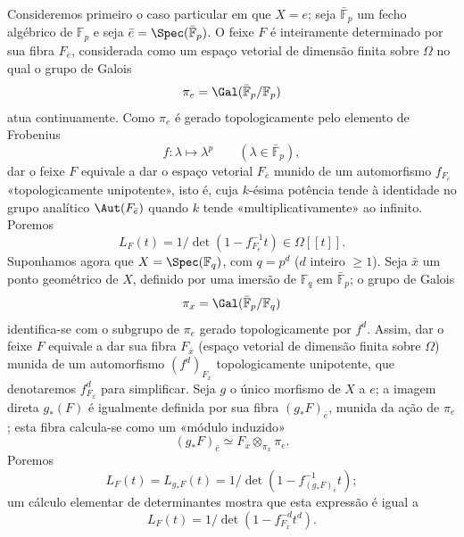 Consideremos primeiro o caso particular em que $X=e$; seja $\bar{\mathbb F}_p$ um fecho algébrico de $\mathbb F_p$ e seja $\bar e=\Spec(\bar{\mathbb F}_p)$. O feixe $F$ é inteiramente determinado por sua fibra $F_{\bar e}$, considerada como um espaço vetorial de dimensão finita sobre $\Omega$ no qual o grupo de Galois
\[
\pi_e=\Gal(\bar{\mathbb F}_p/\mathbb F_p)
\]
atua continuamente. Como $\pi_e$ é gerado topologicamente pelo elemento de Frobenius
\[
f: \lambda\longmapsto \lambda^p\qquad(\lambda\in\bar{\mathbb F}_p),
\]
dar o feixe $F$ equivale a dar o espaço vetorial $F_{\bar e}$ munido de um automorfismo $f_{F_{\bar e}}$ «topologicamente unipotente», isto é, cuja $k$-ésima potência tende à identidade no grupo analítico $\Aut(F_{\bar e})$ quando $k$ tende «multiplicativamente» ao infinito. Poremos
\[
L_F(t)=1/\det(1-f_{F_{\bar e}}^{-1}t)\in\Omega[[t]].
\]
Suponhamos agora que $X=\Spec(\mathbb F_q)$, com $q=p^d$ ($d$ inteiro $\ge1$). Seja $\bar x$ um ponto geométrico de $X$, definido por uma imersão de $\mathbb F_q$ em $\bar{\mathbb F}_p$; o grupo de Galois
\[
\pi_x=\Gal(\bar{\mathbb F}_p/\mathbb F_q)
\]
identifica-se com o subgrupo de $\pi_e$ gerado topologicamente por $f^d$. Assim, dar o feixe $F$ equivale a dar sua fibra $F_{\bar x}$ (espaço vetorial de dimensão finita sobre $\Omega$) munida de um automorfismo $(f^d)_{F_{\bar x}}$ topologicamente unipotente, que denotaremos $f^d_{F_{\bar x}}$ para simplificar. Seja $g$ o único morfismo de $X$ a $e$; a imagem direta $g_*(F)$ é igualmente definida por sua fibra $(g_*F)_{\bar e}$, munida da ação de $\pi_e$; esta fibra calcula-se como um «módulo induzido»
\[
(g_*F)_{\bar e}\simeq F_{\bar x}\otimes_{\pi_x}\pi_e.
\]
Poremos
\[
L_F(t)=L_{g_*F}(t)=1/\det(1-f^{-1}_{(g_*F)_{\bar e}}t);
\]
um cálculo elementar de determinantes mostra que esta expressão é igual a
\[
L_F(t)=1/\det(1-f^{-d}_{F_{\bar x}}t^d).
\]
